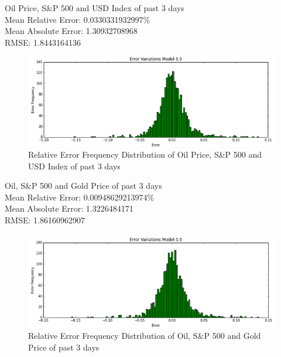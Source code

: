 \documentclass[runningheads]{llncs}
\begin{document}
Oil Price, S\&P 500 and USD Index of past 3 days \\ 
Mean Relative Error: 0.0330331932997\% \\
Mean Absolute Error: 1.30932708968 \\
RMSE: 1.8443164136 \\
\begin{figure}
\centering
\includegraphics[width=\textwidth]{OILSP500USD_Daily.png}
\caption{Relative Error Frequency Distribution of Oil Price, S\&P 500 and USD Index of past 3 days}
\label{fig:OILSP500USD_Daily.png}
\end{figure}

Oil, S\&P 500 and Gold Price of past 3 days \\ 
Mean Relative Error: 0.00948629213974\% \\
Mean Absolute Error: 1.3226484171 \\
RMSE: 1.86160962907 \\
\begin{figure}
\centering
\includegraphics[width=\textwidth]{OILSP500GOLD_Daily.png}
\caption{Relative Error Frequency Distribution of Oil, S\&P 500 and Gold Price of past 3 days}
\label{fig:OILSP500GOLD_Daily.png}
\end{figure}
\end{document}
